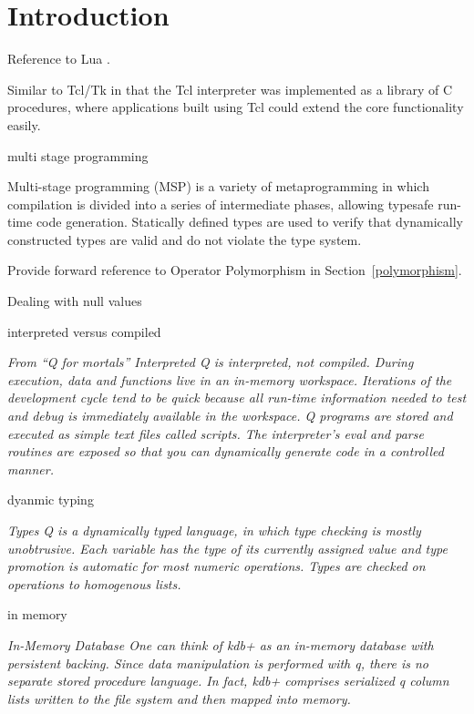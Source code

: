 
\section{Introduction}

\be
\item 
Reference to Lua \cite{Lua2011}.

Similar to Tcl/Tk \cite{Ousterhout2009} in that the Tcl interpreter 
was implemented as a library of C procedures, where applications 
built using Tcl could extend the core functionality easily.

\item multi stage programming

Multi-stage programming (MSP) is a variety of metaprogramming in which
compilation is divided into a series of intermediate phases, allowing typesafe
run-time code generation. Statically defined types are used to verify that
dynamically constructed types are valid and do not violate the type system.

Provide forward reference to Operator Polymorphism in
Section~\ref{polymorphism}.

\item 

Dealing with null values 

\item interpreted versus compiled

{\em  From ``Q for mortals''
  Interpreted Q is interpreted, not compiled. During execution, data and
  functions live in an in-memory workspace. Iterations of the development cycle
  tend to be quick because all run-time information needed to test and debug is
  immediately available in the workspace. Q programs are stored and executed as
  simple text files called scripts. The interpreter's eval and parse routines
  are exposed so that you can dynamically generate code in a controlled manner.

}
\item dyanmic typing

  {\em 
  Types Q is a dynamically typed language, in which type checking is mostly
  unobtrusive. Each variable has the type of its currently assigned value and
  type promotion is automatic for most numeric operations. Types are checked on
  operations to homogenous lists.
}

\item in memory

  {\em 
  In-Memory Database One can think of kdb+ as an in-memory database with
  persistent backing. Since data manipulation is performed with q, there is no
  separate stored procedure language. In fact, kdb+ comprises serialized q
  column lists written to the file system and then mapped into memory.
}

\ee
